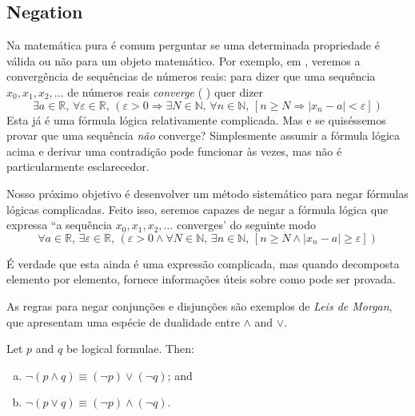 \subsection*{Negation}

Na matemática pura é comum perguntar se uma determinada propriedade é válida ou não para um objeto matemático. Por exemplo, em , veremos a convergência de sequências de números reais: para dizer que uma sequência $x_0,x_1,x_2,\dots$ de números reais \textit{converge}\label{pConvergencePreliminary} ( ) quer dizer
\[ \exists a \in \mathbb{R},\, \forall \varepsilon \in \mathbb{R},\, (\varepsilon > 0 \Rightarrow \exists N \in \mathbb{N},\, \forall n \in \mathbb{N},\, [n \ge N \Rightarrow |x_n-a| < \varepsilon])\]
Esta já é uma fórmula lógica relativamente complicada. Mas e se quiséssemos provar que uma sequência \textit{não} converge? Simplesmente assumir a fórmula lógica acima e derivar uma contradição pode funcionar às vezes, mas não é particularmente esclarecedor.

Nosso próximo objetivo é desenvolver um método sistemático para negar fórmulas lógicas complicadas. Feito isso, seremos capazes de negar a fórmula lógica que expressa “a sequência $x_0, x_1, x_2, \dots$ converges' do seguinte modo
\[ \forall a \in \mathbb{R},\, \exists \varepsilon \in \mathbb{R},\, (\varepsilon > 0 \wedge \forall N \in \mathbb{N},\, \exists n \in \mathbb{N},\, [n \ge N \wedge |x_n-a| \ge \varepsilon])\]

É verdade que esta ainda é uma expressão complicada, mas quando decomposta elemento por elemento, fornece informações úteis sobre como pode ser provada.

As regras para negar conjunções e disjunções são exemplos de \textit{Leis de Morgan}, que apresentam uma espécie de dualidade entre $\wedge$ and $\vee$.

\begin{theorem}
\label{thmDeMorganLogicalOperators}
Let $p$ and $q$ be logical formulae. Then:
\begin{enumerate}[(a)]
\item $\neg (p \wedge q) \equiv (\neg p) \vee (\neg q)$; and
\item $\neg (p \vee q) \equiv (\neg p) \wedge (\neg q)$.
\end{enumerate}
\end{theorem}

